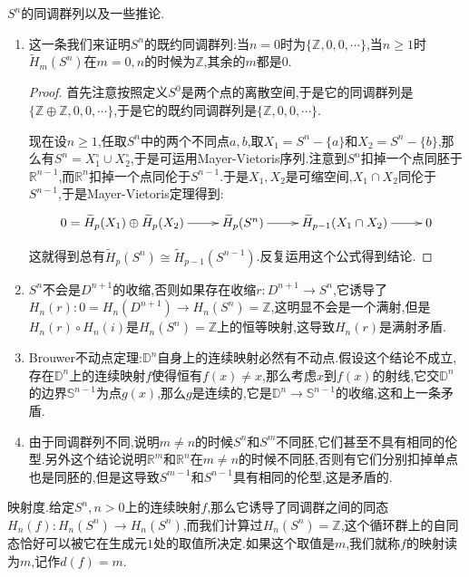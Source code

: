 $S^n$的同调群列以及一些推论.
\begin{enumerate}
	\item 这一条我们来证明$S^n$的既约同调群列:当$n=0$时为$\{\mathbb{Z},0,0,\cdots\}$,当$n\ge1$时$\widetilde{H}_m(S^n)$在$m=0,n$的时候为$\mathbb{Z}$,其余的$m$都是0.
	\begin{proof}
		
		首先注意按照定义$S^0$是两个点的离散空间,于是它的同调群列是$\{\mathbb{Z}\oplus\mathbb{Z},0,0,\cdots\}$,于是它的既约同调群列是$\{\mathbb{Z},0,0,\cdots\}$.
		
		现在设$n\ge1$,任取$S^n$中的两个不同点$a,b$,取$X_1=S^n-\{a\}$和$X_2=S^n-\{b\}$,那么有$S^n=X_1^{\circ}\cup X_2^{\circ}$,于是可运用Mayer-Vietoris序列.注意到$S^n$扣掉一个点同胚于$\mathbb{R}^{n-1}$,而$\mathbb{R}^n$扣掉一个点同伦于$S^{n-1}$.于是$X_1,X_2$是可缩空间,$X_1\cap X_2$同伦于$S^{n-1}$,于是Mayer-Vietoris定理得到:
		$$\xymatrix{0=\widetilde{H}_p(X_1)\oplus\widetilde{H}_p(X_2)\ar[r]&\widetilde{H}_p(S^n)\ar[r]&\widetilde{H}_{p-1}(X_1\cap X_2)\ar[r]&0}$$
		
		这就得到总有$\widetilde{H}_p(S^n)\cong\widetilde{H}_{p-1}(S^{n-1})$.反复运用这个公式得到结论.
	\end{proof}
    \item $S^n$不会是$D^{n+1}$的收缩,否则如果存在收缩$r:D^{n+1}\to S^n$,它诱导了$H_n(r):0=H_n(D^{n+1})\to H_n(S^n)=\mathbb{Z}$,这明显不会是一个满射,但是$H_n(r)\circ H_n(i)$是$H_n(S^n)=\mathbb{Z}$上的恒等映射,这导致$H_n(r)$是满射矛盾.
    \item Brouwer不动点定理:$\mathbb{D}^n$自身上的连续映射必然有不动点.假设这个结论不成立,存在$\mathbb{D}^n$上的连续映射$f$使得恒有$f(x)\not=x$,那么考虑$x$到$f(x)$的射线,它交$\mathbb{D}^n$的边界$\mathbb{S}^{n-1}$为点$g(x)$,那么$g$是连续的,它是$\mathbb{D}^n\to\mathbb{S}^{n-1}$的收缩,这和上一条矛盾.
    \item 由于同调群列不同,说明$m\not=n$的时候$S^n$和$S^m$不同胚,它们甚至不具有相同的伦型.另外这个结论说明$\mathbb{R}^m$和$\mathbb{R}^n$在$m\not=n$的时候不同胚,否则有它们分别扣掉单点也是同胚的,但是这导致$S^{m-1}$和$S^{n-1}$具有相同的伦型,这是矛盾的.
\end{enumerate}

映射度.给定$S^n,n>0$上的连续映射$f$,那么它诱导了同调群之间的同态$H_n(f):H_n(S^n)\to H_n(S^n)$,而我们计算过$H_n(S^n)=\mathbb{Z}$,这个循环群上的自同态恰好可以被它在生成元$1$处的取值所决定.如果这个取值是$m$,我们就称$f$的映射读为$m$,记作$d(f)=m$.

